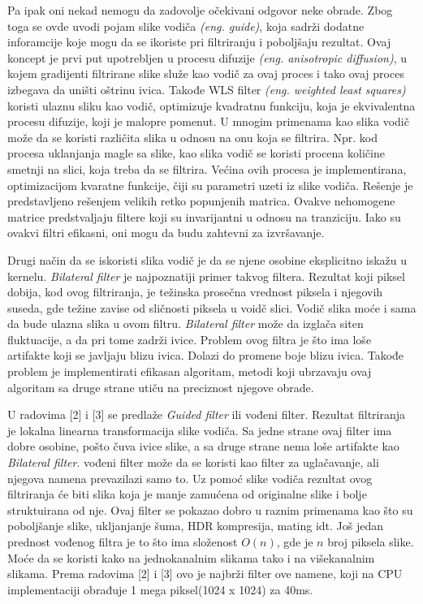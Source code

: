 \documentclass[a4paper,12pt,titlepage]{article}
\begin{document}
Pa ipak oni nekad nemogu da zadovolje očekivani odgovor neke obrade. Zbog toga se ovde uvodi pojam slike vodiča \emph{(eng. guide)}, koja sadrži dodatne inforamcije koje mogu da se ikoriste pri filtriranju i poboljšaju rezultat. Ovaj koncept je prvi put upotrebljen u procesu difuzije \emph{(eng. anisotropic diffusion)}, u kojem gradijenti filtrirane slike služe kao vodič za ovaj proces i tako ovaj proces izbegava da uništi oštrinu ivica. Takođe WLS filter \emph{(eng. weighted least squares)} koristi ulaznu sliku kao vodič, optimizuje kvadratnu funkciju, koja je ekvivalentna procesu difuzije, koji je malopre pomenut. U mnogim primenama kao slika vodič može da se koristi različita slika u odnosu na onu koja se filtrira. Npr. kod procesa uklanjanja magle sa slike, kao slika vodič se koristi procena količine smetnji na slici, koja treba da se filtrira. Većina ovih procesa je implementirana, optimizacijom kvaratne funkcije, čiji su parametri uzeti iz slike vodiča. Rešenje je predstavljeno rešenjem velikih retko popunjenih matrica. Ovakve nehomogene matrice predstvaljaju filtere koji su invarijantni u odnosu na tranziciju. Iako su ovakvi filtri efikasni, oni mogu da budu zahtevni za izvršavanje.

Drugi način da se iskoristi slika vodič je da se njene osobine eksplicitno iskažu u kernelu. \emph{Bilateral filter} je najpoznatiji primer takvog filtera. Rezultat koji piksel dobija, kod ovog filtriranja, je težinska prosečna vrednost piksela i njegovih suseda, gde težine zavise od sličnosti piksela u voidč slici. Vodič slika moće i sama da bude ulazna slika u ovom filtru. \emph{Bilateral filter} može da izglača siten fluktuacije, a da pri tome zadrži ivice. Problem ovog filtra je što ima loše artifakte koji se javljaju blizu ivica. Dolazi do promene boje blizu ivica. Takođe problem je implementirati efikasan algoritam, metodi koji ubrzavaju ovaj algoritam sa druge strane utiču na preciznost njegove obrade.

U radovima [2] i [3] se predlaže \emph{Guided filter} ili vođeni filter. Rezultat filtriranja je lokalna linearna transformacija slike vodiča. Sa jedne strane ovaj filter ima dobre osobine, pošto čuva ivice slike, a sa druge strane nema loše artifakte kao \emph{Bilateral filter}. vođeni filter može da se koristi kao filter za uglačavanje, ali njegova namena prevazilazi samo to. Uz pomoć slike vodiča rezultat ovog filtriranja će biti slika koja je manje zamućena od originalne slike i bolje struktuirana od nje. Ovaj filter se pokazao dobro u raznim primenama kao što su poboljšanje slike, ukljanjanje šuma, HDR kompresija, mating idt. Još jedan prednost vođenog filtra je to što ima složenost $O(n)$, gde je $n$ broj piksela slike. Moće da se koristi kako na jednokanalnim slikama tako i na višekanalnim slikama. Prema radovima [2] i [3] ovo je najbrži filter ove namene, koji na CPU implementaciji obrađuje 1 mega piksel(1024 x 1024) za 40ms. 
\end{document}
